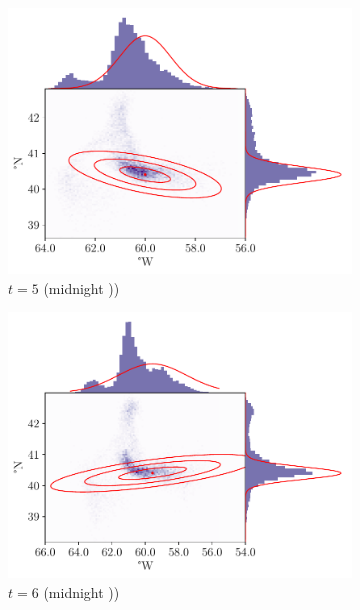 \begin{figure}
\begin{center}
\begin{subfigure}{0.49\textwidth}
			\includegraphics[width=\textwidth]{chp06_applications/figures/gulf_stream/traj_stoch_em_5.0}
			\caption{\(t = 5\) (midnight ))}
		\end{subfigure}
		\begin{subfigure}{0.49\textwidth}
			\includegraphics[width=\textwidth]{chp06_applications/figures/gulf_stream/traj_stoch_em_6.0}
			\caption{\(t = 6\) (midnight ))}
		\end{subfigure}
		\caption{}
		\label{fig:natl_em}
	\end{center}
\end{figure}


